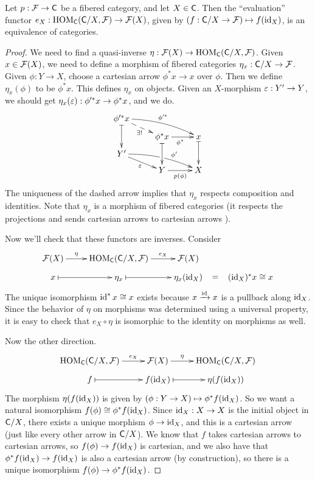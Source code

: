 
 \begin{theorem}
   Let $p:\mathcal{F}\to \text{\sf C}$ be a fibered category, and let $X\in \text{\sf C}$. Then the ``evaluation''
   functor $e_X:\operatorname{HOM}_{\text{\sf C}}(\text{\sf C}/X,\mathcal{F})\to \mathcal{F}(X)$, given by $(f:\text{\sf C}/X\to \mathcal{F})\mapsto f(\operatorname{id}_X)$, is an
   equivalence of categories.
 \end{theorem}
 \begin{proof}
   We need to find a quasi-inverse $\eta:\mathcal{F}(X)\to \operatorname{HOM}_{\text{\sf C}}(\text{\sf C}/X,\mathcal{F})$. Given $x\in \mathcal{F}(X)$, we
   need to define a morphism of fibered categories $\eta_x:\text{\sf C}/X\to \mathcal{F}$. Given
   $\phi:Y\to X$, choose a cartesian arrow $\phi^* x\to x$ over $\phi$. Then we define
   $\eta_x(\phi)$ to be $\phi^* x$. This defines $\eta_x$ on objects. Given an $X$-morphism
   $\varepsilon:Y'\to Y$, we should get $\eta_x(\varepsilon):\phi'^* x\to \phi^* x$, and we do.
   \[\xymatrix@R-1.5pc{
    \phi'^* x \ar@{|->}[dd]\ar@{-->}[dr]_{\exists!} \ar@/^/[rrd]^{\phi'^*}\\
     & \phi^* x\ar@{|->}[dd] \ar[r]_{\phi^*} & x \ar@{|->}[dd]\\
    Y' \ar[dr]_\e \ar@/^/[rrd]^(.65){\phi'}|!{[ru];[rd]}\hole \\
    & Y \ar[r]_{p(\phi)} & X
   }\]
    The uniqueness of the dashed arrow implies that $\eta_x$ respects composition and
   identities. Note that $\eta_x$ is a morphism of fibered categories (it respects the
   projections and sends cartesian arrows to cartesian arrows ). 

   Now we'll check that these functors are inverses. Consider
   \[\xymatrix@R-1.5pc{
    \F(X)\ar[r]^<>(.5)\eta & \HOM_\C(\C/X,\F) \ar[r]^<>(.5){e_X} & \F(X)\\
    x\ar@{|->}[r] & \eta_x \ar@{|->}[r]& \eta_x(\id_X)\ar@{}[r]|<>(.5){\mbox{$=$}}
    & (\id_X)^*x\cong x
   }\]
    The unique isomorphism $\operatorname{id}^* x\cong x$ exists because $x\xrightarrow{\operatorname{id}} x$ is a
   pullback along $\operatorname{id}_X$. Since the behavior of $\eta$ on morphisms was determined using
   a universal property, it is easy to check that $e_X\circ \eta$ is isomorphic to the
   identity on morphisms as well.

   Now the other direction.
   \[\xymatrix@R-1.5pc{
     \HOM_\C(\C/X,\F) \ar[r]^<>(.5){e_X} & \F(X) \ar[r]^<>(.5)\eta & \HOM_\C(\C/X,\F)\\
     f \ar@{|->}[r]& f(\id_X) \ar@{|->}[r]& \eta(f(\id_X))
   }\]
    The morphism $\eta(f(\operatorname{id}_X))$ is given by $(\phi:Y\to X)\mapsto \phi^*f(\operatorname{id}_X)$. So
   we want a natural isomorphism $f(\phi)\cong \phi^*f(\operatorname{id}_X)$. Since $\operatorname{id}_X:X\to X$ is
   the initial object in $\text{\sf C}/X$, there exists a unique morphism $\phi\to \operatorname{id}_X$, and this
   is a cartesian arrow (just like every other arrow in $\text{\sf C}/X$). We know that $f$ takes
   cartesian arrows to cartesian arrows, so $f(\phi)\to f(\operatorname{id}_X)$ is cartesian, and we
   also have that $\phi^*f(\operatorname{id}_X)\to f(\operatorname{id}_X)$ is also a cartesian arrow (by
   construction), so there is a unique isomorphism $f(\phi)\to \phi^*f(\operatorname{id}_X)$.
 \end{proof}

